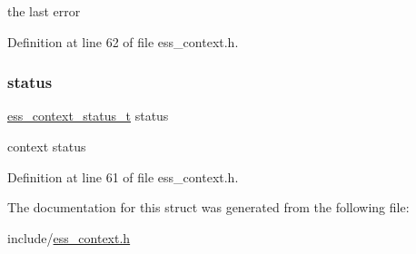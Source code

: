 the last error 

Definition at line 62 of file ess\+\_\+context.\+h.

\mbox{\label{structess__context_a6151ccede5aaf683375710d2677c74c7}} 
\subsubsection{\texorpdfstring{status}{status}}
{\footnotesize\ttfamily \hyperlink{ess__context_8h_adb5314cbbcb2bed6fc8b770d8ef3257c}{ess\+\_\+context\+\_\+status\+\_\+t} status}

context status 

Definition at line 61 of file ess\+\_\+context.\+h.



The documentation for this struct was generated from the following file\+:\begin{DoxyCompactItemize}
\item 
include/\hyperlink{ess__context_8h}{ess\+\_\+context.\+h}\end{DoxyCompactItemize}
